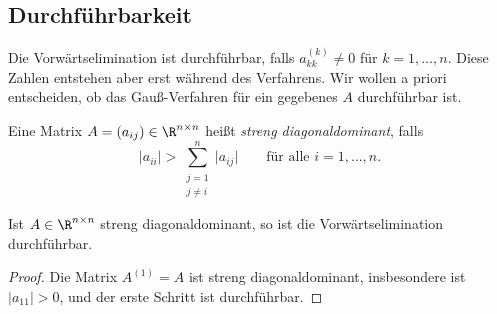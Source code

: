 \documentclass[11pt]{article}
\begin{document}
\subsection{Durchführbarkeit}
\begin{ergaenzung}
Die Vorwärtselimination ist durchführbar, falls $a^{(k)}_{kk} \neq 0$ für $k = 1, \dots, n$. Diese Zahlen entstehen aber erst während des Verfahrens. Wir wollen a priori entscheiden, ob das Gauß-Verfahren für ein gegebenes $A$ durchführbar ist.

\begin{definition}\Theorem
  Eine Matrix $A = (a_{ij}) \in \R^{n \times n}$ heißt \emph{streng diagonaldominant}, falls
  \[ \lvert a_{ii} \rvert > \sum_{\substack{j=1 \\ j \neq i}}^{n} \lvert a_{ij} \rvert \qquad \text{für alle } i = 1, \dots, n. \]
\end{definition}

\begin{lemma}\Theorem
  Ist $A \in \R^{n \times n}$ streng diagonaldominant, so ist die Vorwärtselimination durchführbar.
\end{lemma}

\begin{proof}
  Die Matrix $A^{(1)} = A$ ist streng diagonaldominant, insbesondere ist $\lvert a_{11} \rvert > 0$, und der erste Schritt ist durchführbar.


\end{proof}
\end{ergaenzung}
\end{document}
